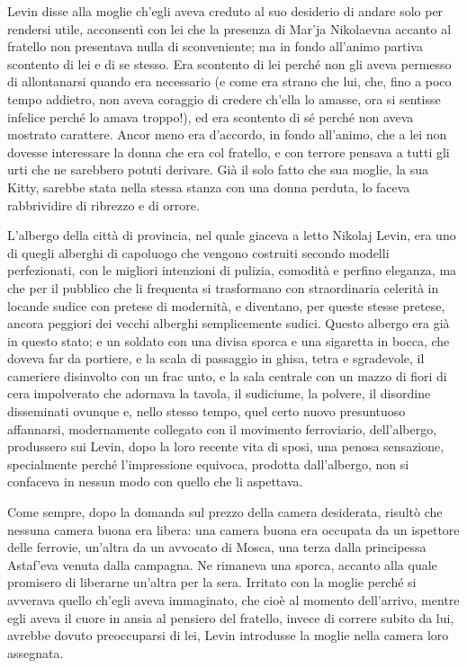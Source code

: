 Levin disse alla moglie ch'egli aveva creduto al suo desiderio di andare solo per rendersi utile, acconsentì con lei che la presenza di Mar'ja Nikolaevna accanto al fratello non presentava nulla di sconveniente; ma in fondo all'animo partiva scontento di lei e di se stesso. Era scontento di lei perché non gli aveva permesso di allontanarsi quando era necessario (e come era strano che lui, che, fino a poco tempo addietro, non aveva coraggio di credere ch'ella lo amasse, ora si sentisse infelice perché lo amava troppo!), ed era scontento di sé perché non aveva mostrato carattere. Ancor meno era d'accordo, in fondo all'animo, che a lei non dovesse interessare la donna che era col fratello, e con terrore pensava a tutti gli urti che ne sarebbero potuti derivare. Già il solo fatto che sua moglie, la sua Kitty, sarebbe stata nella stessa stanza con una donna perduta, lo faceva rabbrividire di ribrezzo e di orrore. 

\label{xvii-4} 

L'albergo della città di provincia, nel quale giaceva a letto Nikolaj Levin, era uno di quegli alberghi di capoluogo che vengono costruiti secondo modelli perfezionati, con le migliori intenzioni di pulizia, comodità e perfino eleganza, ma che per il pubblico che li frequenta si trasformano con straordinaria celerità in locande sudice con pretese di modernità, e diventano, per queste stesse pretese, ancora peggiori dei vecchi alberghi semplicemente sudici. Questo albergo era già in questo stato; e un soldato con una divisa sporca e una sigaretta in bocca, che doveva far da portiere, e la scala di passaggio in ghisa, tetra e sgradevole, il cameriere disinvolto con un frac unto, e la sala centrale con un mazzo di fiori di cera impolverato che adornava la tavola, il sudiciume, la polvere, il disordine disseminati ovunque e, nello stesso tempo, quel certo nuovo presuntuoso affannarsi, modernamente collegato con il movimento ferroviario, dell'albergo, produssero sui Levin, dopo la loro recente vita di sposi, una penosa sensazione, specialmente perché l'impressione equivoca, prodotta dall'albergo, non si confaceva in nessun modo con quello che li aspettava. 

Come sempre, dopo la domanda sul prezzo della camera desiderata, risultò che nessuna camera buona era libera: una camera buona era occupata da un ispettore delle ferrovie, un'altra da un avvocato di Mosca, una terza dalla principessa Astaf'eva venuta dalla campagna. Ne rimaneva una sporca, accanto alla quale promisero di liberarne un'altra per la sera. Irritato con la moglie perché si avverava quello ch'egli aveva immaginato, che cioè al momento dell'arrivo, mentre egli aveva il cuore in ansia al pensiero del fratello, invece di correre subito da lui, avrebbe dovuto preoccuparsi di lei, Levin introdusse la moglie nella camera loro assegnata. 

